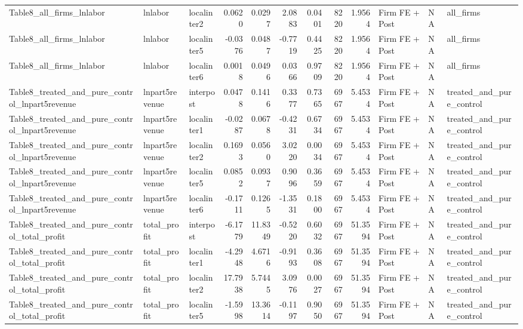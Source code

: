 \begin{table}
\begin{tabular}[t]{lllrrrrrrlll}
Table8\_all\_firms\_lnlabor & lnlabor & localinter2 & 0.0620 & 0.0297 & 2.0883 & 0.0401 & 8220 & 1.9564 & Firm FE + Post & NA & all\_firms\\
Table8\_all\_firms\_lnlabor & lnlabor & localinter5 & -0.0376 & 0.0487 & -0.7719 & 0.4425 & 8220 & 1.9564 & Firm FE + Post & NA & all\_firms\\
Table8\_all\_firms\_lnlabor & lnlabor & localinter6 & 0.0018 & 0.0496 & 0.0366 & 0.9709 & 8220 & 1.9564 & Firm FE + Post & NA & all\_firms\\
\addlinespace
Table8\_treated\_and\_pure\_control\_lnpart5revenue & lnpart5revenue & interpost & 0.0478 & 0.1416 & 0.3377 & 0.7365 & 6967 & 5.4534 & Firm FE + Post & NA & treated\_and\_pure\_control\\
Table8\_treated\_and\_pure\_control\_lnpart5revenue & lnpart5revenue & localinter1 & -0.0287 & 0.0678 & -0.4231 & 0.6734 & 6967 & 5.4534 & Firm FE + Post & NA & treated\_and\_pure\_control\\
Table8\_treated\_and\_pure\_control\_lnpart5revenue & lnpart5revenue & localinter2 & 0.1693 & 0.0560 & 3.0220 & 0.0034 & 6967 & 5.4534 & Firm FE + Post & NA & treated\_and\_pure\_control\\
Table8\_treated\_and\_pure\_control\_lnpart5revenue & lnpart5revenue & localinter5 & 0.0852 & 0.0937 & 0.9096 & 0.3659 & 6967 & 5.4534 & Firm FE + Post & NA & treated\_and\_pure\_control\\
Table8\_treated\_and\_pure\_control\_lnpart5revenue & lnpart5revenue & localinter6 & -0.1711 & 0.1265 & -1.3531 & 0.1800 & 6967 & 5.4534 & Firm FE + Post & NA & treated\_and\_pure\_control\\
\addlinespace
Table8\_treated\_and\_pure\_control\_total\_profit & total\_profit & interpost & -6.1779 & 11.8349 & -0.5220 & 0.6032 & 6967 & 51.3594 & Firm FE + Post & NA & treated\_and\_pure\_control\\
Table8\_treated\_and\_pure\_control\_total\_profit & total\_profit & localinter1 & -4.2948 & 4.6716 & -0.9193 & 0.3608 & 6967 & 51.3594 & Firm FE + Post & NA & treated\_and\_pure\_control\\
Table8\_treated\_and\_pure\_control\_total\_profit & total\_profit & localinter2 & 17.7938 & 5.7445 & 3.0976 & 0.0027 & 6967 & 51.3594 & Firm FE + Post & NA & treated\_and\_pure\_control\\
Table8\_treated\_and\_pure\_control\_total\_profit & total\_profit & localinter5 & -1.5998 & 13.3614 & -0.1197 & 0.9050 & 6967 & 51.3594 & Firm FE + Post & NA & treated\_and\_pure\_control\\

\end{tabular}
\end{table}
